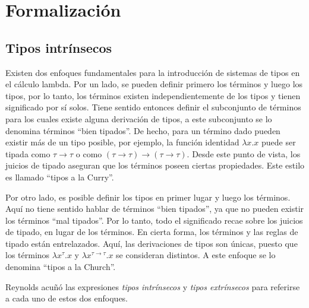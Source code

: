 \newcommand{\const}[1]{\AgdaInductiveConstructor{#1}}
\newcommand{\bound}[1]{\AgdaBound{#1}}
\newcommand{\func}[1]{\AgdaFunction{#1}}
\newcommand{\type}[1]{\AgdaDatatype{#1}}
\newcommand{\snstar}{\type{SN*}~\func{⟦\_⟧}~}
\newcommand{\cand}[1]{\func{⟦}#1\func{⟧}}
\newcommand{\pair}[2]{\const{⟨}~#1~\const{,}~#2~\const{⟩}}

\newcommand{\parens}[1]{\AgdaSymbol{(}#1\AgdaSymbol{)}}
\newcommand{\subst}[2]{\func{⟪}~#1~\func{⟫}~#2}
\newcommand{\cons}[2]{#1~\func{•}~#2}
\newcommand{\ids}{\func{ids}}
\newcommand{\comp}[2]{#1~\func{∘}~#2}


\section{Formalización}

\subsection{Tipos intrínsecos}

Existen dos enfoques fundamentales para la introducción de sistemas de tipos en el cálculo lambda.
Por un lado, se pueden definir primero los términos y luego los tipos, por lo tanto, los términos existen independientemente de los tipos y tienen significado por sí solos.
Tiene sentido entonces definir el subconjunto de términos para los cuales existe alguna derivación de tipos, a este subconjunto se lo denomina términos ``bien tipados''.
De hecho, para un término dado pueden existir más de un tipo posible, por ejemplo, la función identidad $\lambda x.x$ puede ser tipada como $\tau \rightarrow \tau$ o como $(\tau \rightarrow \tau) \rightarrow (\tau \rightarrow \tau)$.
Desde este punto de vista, los juicios de tipado aseguran que los términos poseen ciertas propiedades.
Este estilo es llamado ``tipos a la Curry''.

Por otro lado, es posible definir los tipos en primer lugar y luego los términos.
Aquí no tiene sentido hablar de términos ``bien tipados'', ya que no pueden existir los términos ``mal tipados''.
Por lo tanto, todo el significado recae sobre los juicios de tipado, en lugar de los términos.
En cierta forma, los términos y las reglas de tipado están entrelazados.
Aquí, las derivaciones de tipos son únicas, puesto que los términos $\lambda x^\tau.x$ y $\lambda x^{\tau \rightarrow \tau}.x$ se consideran distintos.
A este enfoque se lo denomina ``tipos a la Church''.

Reynolds \cite{reynolds_1998} acuñó las expresiones \textit{tipos intrínsecos} y \textit{tipos extrínsecos} para referirse a cada uno de estos dos enfoques.

